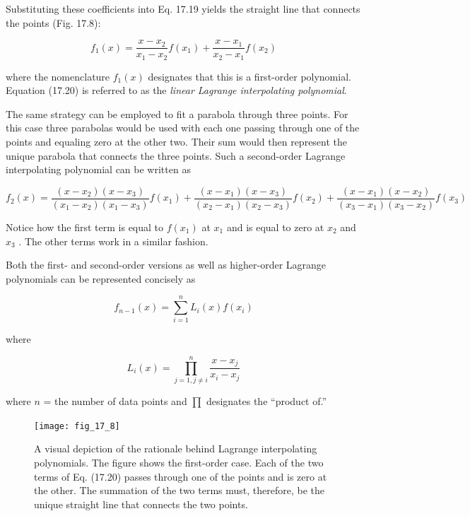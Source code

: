 \documentclass[../main.tex]{subfiles}
\begin{document}
\noindent Substituting these coefficients into Eq. 17.19 yields the straight line that connects the
points (Fig. 17.8):

\begin{equation}
	\tag{17.20}
	f_1(x) = \frac{x - x_2}{x_1 - x_2} f(x_1) + \frac{x - x_1}{x_2 - x_1} f(x_2)
\end{equation}

\noindent where the nomenclature $f_1(x)$ designates that this is a first-order polynomial. Equation (17.20) is referred to as the \textit{linear Lagrange interpolating polynomial}.

The same strategy can be employed to fit a parabola through three points. For this case
three parabolas would be used with each one passing through one of the points and equaling zero at the other two. Their sum would then represent the unique parabola that connects
the three points. Such a second-order Lagrange interpolating polynomial can be written as

\begin{equation}
	\tag{17.21}
	f_2(x) = \frac{(x - x_2) (x - x_3)}{(x_1 - x_2)(x_1 - x_3)} f(x_1) + \frac{(x - x_1) (x - x_3)}{(x_2 - x_1) (x_2 - x_3)} f(x_2) + \frac{(x - x_1) (x - x_2)}{(x_3 - x_1) (x_3 - x_2)} f(x_3)
\end{equation}

\noindent Notice how the first term is equal to $f (x_1 )$ at $x_1$ and is equal to zero at $x_2$ and $x_3$ . The other
terms work in a similar fashion.

Both the first- and second-order versions as well as higher-order Lagrange polynomials can be represented concisely as

\begin{equation}
	\tag{17.22}
	f_{n-1}(x) = \sum ^ n _ {i=1} L_i (x) f(x_i)
\end{equation}

\noindent where

\begin{equation}
	\tag{17.23}
	L_i (x) = \prod ^n _{j=1, j \neq i} \frac{x - x_j}{x_i - x_j}
\end{equation}

\noindent where $n$ = the number of data points and $\prod$ designates the ``product of.''

\begin{figure}[H] 
	\centering
	\texttt{[image: fig\_17\_8]}
	\caption{\textsf{A visual depiction of the rationale behind Lagrange interpolating polynomials. The figure shows
	the first-order case. Each of the two terms of Eq. (17.20) passes through one of the points and
	is zero at the other. The summation of the two terms must, therefore, be the unique straight line
	that connects the two points.}}
	\label{fig:fig_17_8}
\end{figure}
\end{document}
